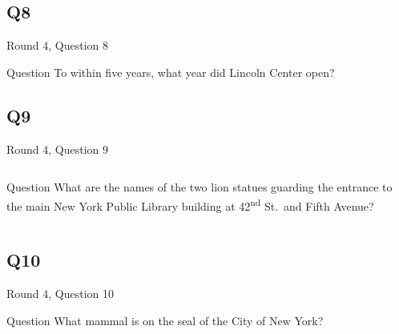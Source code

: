 \documentclass[11pt]{beamer}
\begin{document}
\subsection*{Q8}
\begin{frame}[t]{Round 4, Question 8}
\begin{block}{Question}
To within five years, what year did Lincoln Center open?
\end{block}
\end{frame}
\subsection*{Q9}
\begin{frame}[t]{Round 4, Question 9}
\begin{columns}[T,totalwidth=\linewidth]
\begin{column}{0.32\linewidth}
\begin{block}{Question}
What are the names of the two lion statues guarding the entrance to the main New York Public Library building at 42\textsuperscript{nd} St.\ and Fifth Avenue?
\end{block}
\end{column}
\begin{column}{0.65\linewidth}
\begin{center}
\texttt{[image: \{Images/nypl]}.jpg}
\end{center}
\end{column}
\end{columns}
\end{frame}
\subsection*{Q10}
\begin{frame}[t]{Round 4, Question 10}
\begin{block}{Question}
What mammal is on the seal of the City of New York?
\end{block}
\end{frame}
\end{document}
